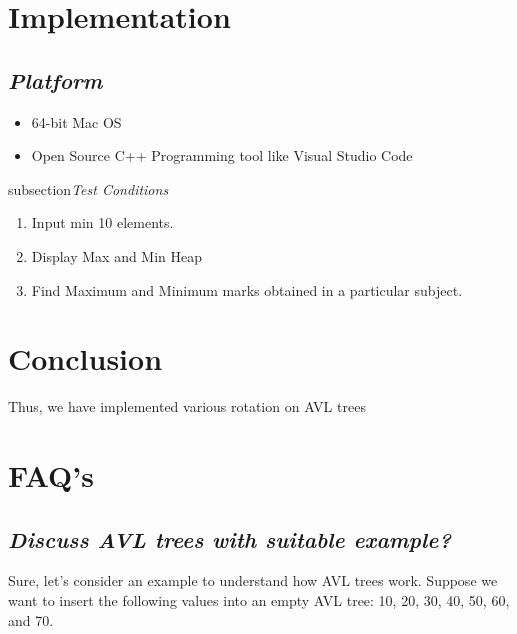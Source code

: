\documentclass{article}
\begin{document}
\section{\textbf{Implementation}}
\subsection{\textit{Platform}}
\begin{itemize}
	\item 64-bit Mac OS
	\item Open Source C++ Programming tool like Visual Studio Code
\end{itemize}
subsection{\textit{Test Conditions}}
\begin{enumerate}
    \item Input min 10 elements.
    \item Display Max and Min Heap
    \item Find Maximum and Minimum marks obtained in a particular subject.
\end{enumerate}
\section{\textbf{Conclusion}}
Thus, we have implemented various rotation on AVL trees
\section{\textbf{FAQ's}}
\subsection{\textit{Discuss AVL trees with suitable example?}}
Sure, let's consider an example to understand how AVL trees work. Suppose we want to insert the following values into an empty AVL tree: 10, 20, 30, 40, 50, 60, and 70.
\end{document}
